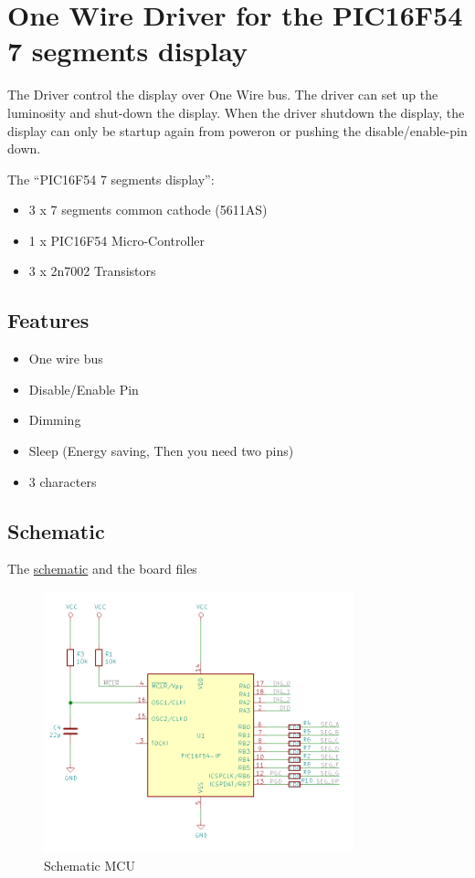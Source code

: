 \section{One Wire Driver for the PIC16F54 7 segments
display}\label{one-wire-driver-for-the-pic16f54-7-segments-display}

The Driver control the display over One Wire bus. The driver can set up
the luminosity and shut-down the display. When the driver shutdown the
display, the display can only be startup again from poweron or pushing
the disable/enable-pin down.

The ``PIC16F54 7 segments display'':

\begin{itemize}
\tightlist
\item
  3 x 7 segments common cathode (5611AS)
\item
  1 x PIC16F54 Micro-Controller
\item
  3 x 2n7002 Transistors
\end{itemize}

\subsection{Features}\label{features}

\begin{itemize}
\tightlist
\item
  One wire bus
\item
  Disable/Enable Pin
\item
  Dimming
\item
  Sleep (Energy saving, Then you need two pins)
\item
  3 characters
\end{itemize}

\subsection{Schematic}\label{schematic}

The
\href{documents/images/pic16f54-7-segments-display-schematic.pdf}{schematic}
and the board files

\begin{figure}[htbp]
\centering
\includegraphics[width=0.80000\textwidth]{documents/images/schematic_mcu.png}
\caption{Schematic MCU\label{schematic_mcu}}
\end{figure}

